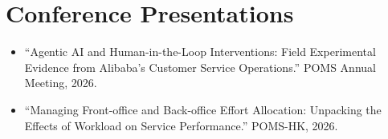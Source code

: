 \section*{Conference Presentations}

\begin{itemize}[leftmargin=1.2em]
  \cvitemsep
  \item ``Agentic AI and Human-in-the-Loop Interventions: Field Experimental Evidence from Alibaba's Customer Service Operations.'' POMS Annual Meeting, 2026.
  \item ``Managing Front-office and Back-office Effort Allocation: Unpacking the Effects of Workload on Service Performance.'' POMS-HK, 2026.
\end{itemize}

